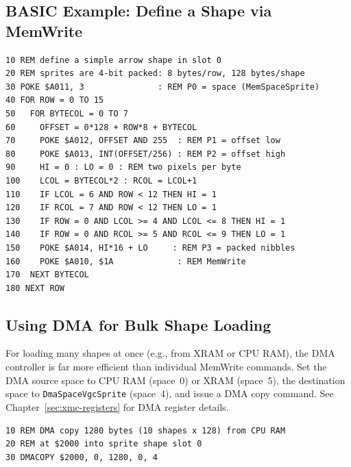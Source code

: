 \subsection{BASIC Example: Define a Shape via MemWrite}

\begin{lstlisting}
10 REM define a simple arrow shape in slot 0
20 REM sprites are 4-bit packed: 8 bytes/row, 128 bytes/shape
30 POKE $A011, 3               : REM P0 = space (MemSpaceSprite)
40 FOR ROW = 0 TO 15
50   FOR BYTECOL = 0 TO 7
60     OFFSET = 0*128 + ROW*8 + BYTECOL
70     POKE $A012, OFFSET AND 255  : REM P1 = offset low
80     POKE $A013, INT(OFFSET/256) : REM P2 = offset high
90     HI = 0 : LO = 0 : REM two pixels per byte
100    LCOL = BYTECOL*2 : RCOL = LCOL+1
110    IF LCOL = 6 AND ROW < 12 THEN HI = 1
120    IF RCOL = 7 AND ROW < 12 THEN LO = 1
130    IF ROW = 0 AND LCOL >= 4 AND LCOL <= 8 THEN HI = 1
140    IF ROW = 0 AND RCOL >= 5 AND RCOL <= 9 THEN LO = 1
150    POKE $A014, HI*16 + LO     : REM P3 = packed nibbles
160    POKE $A010, $1A             : REM MemWrite
170  NEXT BYTECOL
180 NEXT ROW
\end{lstlisting}

\subsection{Using DMA for Bulk Shape Loading}

For loading many shapes at once (e.g., from XRAM or CPU RAM), the DMA controller
is far more efficient than individual MemWrite commands.  Set the DMA source
space to CPU RAM (space~0) or XRAM (space~5), the destination space to
\texttt{DmaSpaceVgcSprite} (space~4), and issue a DMA copy command.  See
Chapter~\ref{sec:xmc-registers} for DMA register details.

\begin{lstlisting}
10 REM DMA copy 1280 bytes (10 shapes x 128) from CPU RAM
20 REM at $2000 into sprite shape slot 0
30 DMACOPY $2000, 0, 1280, 0, 4
\end{lstlisting}
